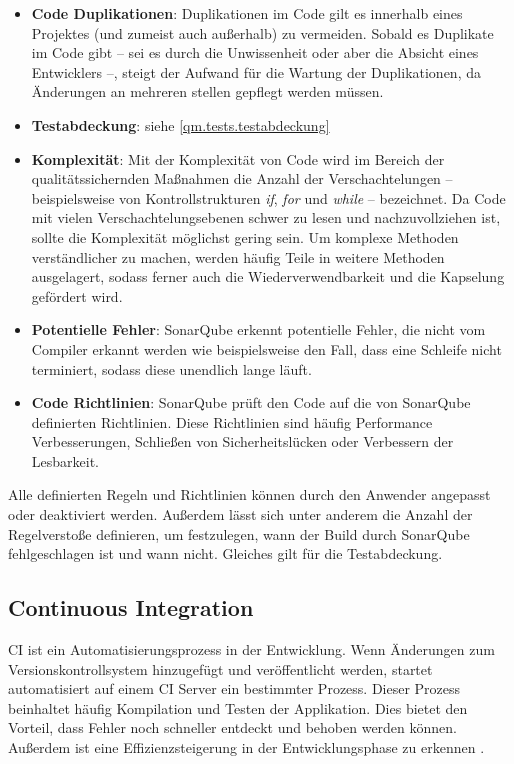 			\begin{itemize}
				\item \textbf{Code Duplikationen}: Duplikationen im Code gilt es innerhalb eines Projektes (und zumeist auch außerhalb) zu vermeiden. Sobald es Duplikate im Code gibt -- sei es durch die Unwissenheit oder aber die Absicht eines Entwicklers --, steigt der Aufwand für die Wartung der Duplikationen, da Änderungen an mehreren stellen gepflegt werden müssen.
				\item \textbf{Testabdeckung}: siehe \autoref{qm.tests.testabdeckung}
				\item \textbf{Komplexität}: Mit der Komplexität von Code wird im Bereich der qualitätssichernden Maßnahmen die Anzahl der Verschachtelungen -- beispielsweise von Kontrollstrukturen \textit{if}, \textit{for} und \textit{while} -- bezeichnet. Da Code mit vielen Verschachtelungsebenen schwer zu lesen und nachzuvollziehen ist, sollte die Komplexität möglichst gering sein. Um komplexe Methoden verständlicher zu machen, werden häufig Teile in weitere Methoden ausgelagert, sodass ferner auch die Wiederverwendbarkeit und die Kapselung gefördert wird. 
				\item \textbf{Potentielle Fehler}: SonarQube erkennt potentielle Fehler, die nicht vom Compiler erkannt werden wie beispielsweise den Fall, dass eine Schleife nicht terminiert, sodass diese unendlich lange läuft. 
				\item \textbf{Code Richtlinien}: SonarQube prüft den Code auf die von SonarQube definierten Richtlinien. Diese Richtlinien sind häufig Performance Verbesserungen, Schließen von Sicherheitslücken oder Verbessern der Lesbarkeit. 
			\end{itemize}
		
			Alle definierten Regeln und Richtlinien können durch den Anwender angepasst oder deaktiviert werden. Außerdem lässt sich unter anderem die Anzahl der Regelverstoße definieren, um festzulegen, wann der Build durch SonarQube fehlgeschlagen ist und wann nicht. Gleiches gilt für die Testabdeckung. 
		
		\subsection{Continuous Integration}
		
			\ac{CI} ist ein Automatisierungsprozess in der Entwicklung. Wenn Änderungen zum Versionskontrollsystem hinzugefügt und veröffentlicht werden, startet automatisiert auf einem \acs{CI} Server ein bestimmter Prozess. Dieser Prozess beinhaltet häufig Kompilation und Testen der Applikation. Dies bietet den Vorteil, dass Fehler noch schneller entdeckt und behoben werden können. Außerdem ist eine Effizienzsteigerung in der Entwicklungsphase zu erkennen \cite{MartinFowler.2292020}. 
			
